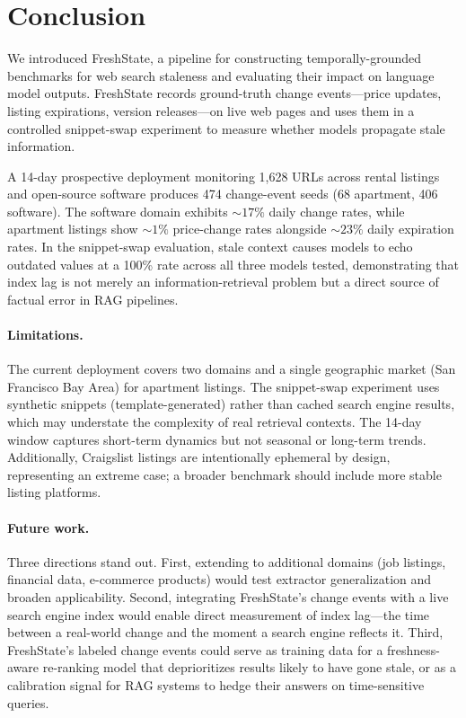 \section{Conclusion}
\label{sec:conclusion}

We introduced FreshState, a pipeline for constructing temporally-grounded
benchmarks for web search staleness and evaluating their impact on language model
outputs. FreshState records ground-truth change events---price updates, listing
expirations, version releases---on live web pages and uses them in a controlled
snippet-swap experiment to measure whether models propagate stale information.

A 14-day prospective deployment monitoring 1,628 URLs across rental listings and
open-source software produces 474 change-event seeds (68 apartment, 406 software).
The software domain exhibits ${\sim}17\%$ daily change rates, while apartment
listings show ${\sim}1\%$ price-change rates alongside ${\sim}23\%$ daily expiration
rates. In the snippet-swap evaluation, stale context causes models to echo
outdated values at a 100\% rate across all three models tested, demonstrating that index lag is
not merely an information-retrieval problem but a direct source of factual error
in RAG pipelines.

\paragraph{Limitations.}
The current deployment covers two domains and a single geographic market (San
Francisco Bay Area) for apartment listings. The snippet-swap experiment uses
synthetic snippets (template-generated) rather than cached search engine results,
which may understate the complexity of real retrieval contexts. The 14-day window
captures short-term dynamics but not seasonal or long-term trends. Additionally,
Craigslist listings are intentionally ephemeral by design, representing an extreme
case; a broader benchmark should include more stable listing platforms.

\paragraph{Future work.}
Three directions stand out. First, extending to additional domains (job listings,
financial data, e-commerce products) would test extractor generalization and
broaden applicability. Second, integrating FreshState's change events with a live
search engine index would enable direct measurement of index lag---the time between
a real-world change and the moment a search engine reflects it. Third, FreshState's
labeled change events could serve as training data for a freshness-aware re-ranking
model that deprioritizes results likely to have gone stale, or as a calibration
signal for RAG systems to hedge their answers on time-sensitive queries.

